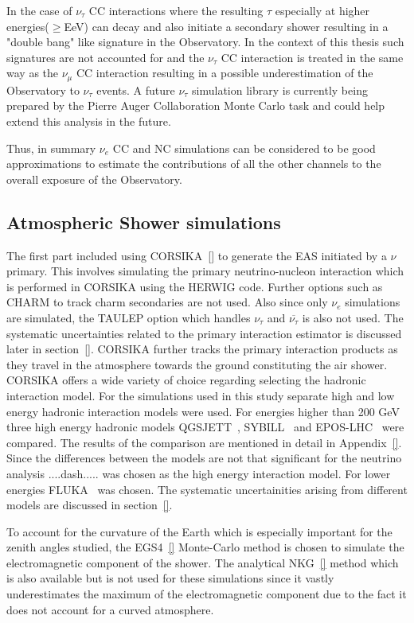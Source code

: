 In the case of $\nu_{\tau}$ CC interactions where the resulting $\tau$ especially at higher energies($\geq $EeV) can decay and also initiate a secondary shower resulting in a "double bang" like signature in the Observatory. In the context of this thesis such signatures are not accounted for and the $\nu_{\tau}$ CC interaction is treated in the same way as the $\nu_{\mu}$ CC interaction resulting in a possible underestimation of the Observatory to $\nu_{\tau}$ events. A future $\nu_{\tau}$ simulation library is currently being prepared by the Pierre Auger Collaboration Monte Carlo task and could help extend this analysis in the future.

Thus, in summary $\nu_e$ CC and NC simulations can be considered to be good approximations to estimate the contributions of all the other channels to the overall exposure of the Observatory.

\subsection{Atmospheric Shower simulations}
\label{subsec:sim_EAS}
The first part included using CORSIKA~\ref{} to generate the EAS initiated by a $\nu$ primary. This involves simulating the primary neutrino-nucleon interaction which is performed in CORSIKA using the HERWIG code. Further options such as CHARM to track charm secondaries are not used. Also since only $\nu_e$ simulations are simulated, the TAULEP option which handles $\nu_{\tau}$ and $\overline{\nu_{\tau}}$ is also not used. The systematic uncertainties related to the primary interaction estimator is discussed later in section~\ref{}. CORSIKA further tracks the primary interaction products as they travel in the atmosphere towards the ground constituting the air shower. CORSIKA offers a wide variety of choice regarding selecting the hadronic interaction model. For the simulations used in this study separate high and low energy hadronic interaction models were used. For energies higher than 200 GeV three high energy hadronic models QGSJETT~\cite{}, SYBILL~\cite{} and EPOS-LHC~\cite{} were compared. The results of the comparison are mentioned in detail in Appendix~\ref{}. Since the differences between the models are not that significant for the neutrino analysis ....dash..... was chosen as the high energy interaction model. For lower energies FLUKA~\cite{} was chosen. The systematic uncertainities arising from different models are discussed in section~\ref{}.  

To account for the curvature of the Earth which is especially important for the zenith angles studied, the EGS4~\ref{} Monte-Carlo method is chosen to simulate the electromagnetic component of the shower. The analytical NKG~\ref{} method which is also available but is not used for these simulations since it vastly underestimates the maximum of the electromagnetic component due to the fact it does not account for a curved atmosphere.    




